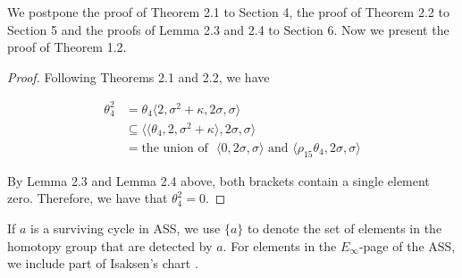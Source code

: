 \documentclass[psamsfonts]{amsart}
\newtheorem{lem}[thm]{Lemma}
\theoremstyle{definition}
\numberwithin{equation}{section}
\begin{document}

We postpone the proof of Theorem 2.1 to Section 4, the proof of Theorem 2.2 to Section 5 and the proofs of Lemma 2.3 and 2.4 to Section 6. Now we present the proof of Theorem 1.2.

\begin{proof}
Following Theorems 2.1 and 2.2, we have

\begin{equation*}
\begin{split}
\theta_4^2 & = \theta_4 \langle 2, \sigma^2 + \kappa, 2 \sigma, \sigma \rangle \\
& \subseteq \langle\langle\theta_4, 2, \sigma^2 + \kappa\rangle, 2\sigma, \sigma\rangle \\
& = \text{the union of~~}  \langle 0, 2\sigma, \sigma\rangle \text{~and~} \langle \rho_{15}\theta_4, 2\sigma, \sigma \rangle
\end{split}
\end{equation*}

By Lemma 2.3 and Lemma 2.4 above, both brackets contain a single element zero. Therefore, we have that $\theta_4^2=0$.
\end{proof}

If $a$ is a surviving cycle in ASS, we use $\{a\}$ to denote the set of elements in the homotopy group that are detected by $a$. For elements in the $E_\infty$-page of the ASS, we include part of Isaksen's chart \cite{DI2}. 


~\\

~\\


\end{document}
